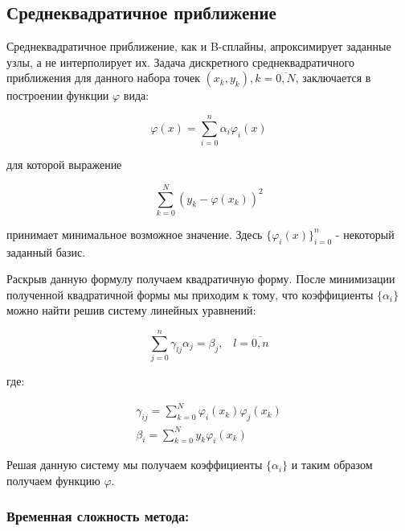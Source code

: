 

\subsection{Среднеквадратичное приближение}

Среднеквадратичное приближение, как и B-сплайны, апроксимирует заданные узлы, а не интерполирует их. Задача дискретного среднеквадратичного приближения для данного набора точек $(x_k, y_k), k = \overline{0, N}$, заключается в построении функции $\varphi$ вида:

\begin{equation}
  \varphi(x) = \sum^n_{i=0} \alpha_i \varphi_i(x)
\end{equation}

\noindent для которой выражение

\begin{equation}
  \sum^N_{k=0}(y_k - \varphi(x_k))^2
\end{equation}

\noindent принимает минимальное возможное значение. Здесь $\{\varphi_i(x)\}^n_{i=0}$ - некоторый заданный базис.

Раскрыв данную формулу получаем квадратичную форму. После минимизации полученной квадратичной формы мы приходим к тому, что коэффициенты $\{\alpha_i\}$ можно найти решив систему линейных уравнений:

\begin{equation}
  \sum^n_{j=0} \gamma_{lj} \alpha_j = \beta_j, \;\;\; l = \overline{0, n}
\end{equation}

\noindent где:

\begin{equation}
  \begin{gathered}
    \gamma_{ij} = \sum^N_{k=0} \varphi_i(x_k) \varphi_j(x_k) \\
    \beta_i = \sum^N_{k=0} y_k \varphi_i(x_k)
  \end{gathered}
\end{equation}

Решая данную систему мы получаем коэффициенты $\{\alpha_i\}$ и таким образом получаем функцию $\varphi$.

\subsubsection{Временная сложность метода:}

